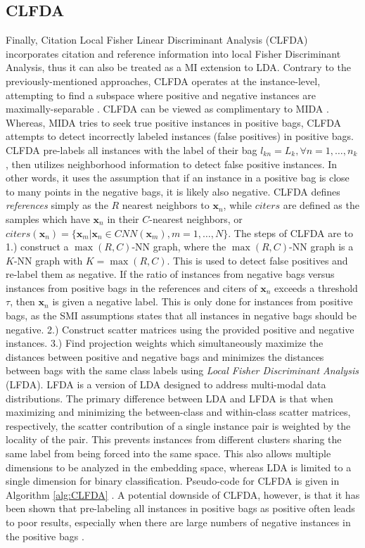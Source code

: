 \subsection{CLFDA} \label{sec:CLFDA}
Finally, Citation Local Fisher Linear Discriminant Analysis (CLFDA) \citep{Kim2010LocalDRMIL} incorporates citation and reference information into local Fisher Discriminant Analysis, thus it can also be treated as a MI extension to LDA.  Contrary to the previously-mentioned approaches, CLFDA operates at the instance-level, attempting to find a subspace where positive and negative instances are maximally-separable \citep{Latham2015MIFeatureRankingThesis}.  CLFDA can be viewed as complimentary to MIDA \citep{Chai2014MIDA}.  Whereas, MIDA tries to seek true positive instances in positive bags, CLFDA attempts to detect incorrectly labeled instances (false positives) in positive bags.  CLFDA pre-labels all instances with the label of their bag  $l_{kn} = L_{k}, \forall n = 1,\dots,n_{k}$, then utilizes neighborhood information to detect false positive instances.  In other words, it uses the assumption that if an instance in a positive bag is close to many points in the negative bags, it is likely also negative.  CLFDA defines \textit{references} simply as the $R$ nearest neighbors to $\bm{x}_{n}$, while $citers$ are defined as the samples which have $\bm{x}_{n}$ in their $C$-nearest neighbors, or $citers(\bm{x}_{n}) = \{ \bm{x}_{m}| \bm{x}_{n} \in CNN(\bm{x}_{m}), m=1, \dots, N \}$.   The steps of CLFDA are to 1.) construct a $\max(R,C)$-NN graph, where the $\max(R,C)$-NN graph is a $K$-NN graph with $K=\max(R,C)$.  This is used to detect false positives and re-label them as negative.  If the ratio of instances from negative bags versus instances from positive bags in the references and citers of $\bm{x}_n$ exceeds a threshold $\tau$, then $\bm{x}_{n}$ is given a negative label. This is only done for instances from positive bags, as the SMI assumptions states that all instances in negative bags should be negative. 2.) Construct scatter matrices using the provided positive and negative instances. 3.) Find projection weights which simultaneously maximize the distances between positive and negative bags and minimizes the distances between bags with the same class labels using \textit{Local Fisher Discriminant Analysis} (LFDA).  LFDA is a version of LDA  designed to address multi-modal data distributions.  The primary difference between LDA and LFDA is that when maximizing and minimizing the between-class and within-class scatter matrices, respectively, the scatter contribution of a single instance pair is weighted by the locality of the pair.  This prevents instances from different clusters sharing the same label from being forced into  the same space.  This also allows multiple dimensions to be analyzed in the embedding space, whereas LDA is limited to a single dimension for binary classification.  Pseudo-code for CLFDA is given in Algorithm \ref{alg:CLFDA} \citep{Latham2015MIFeatureRankingThesis}.  A potential downside of CLFDA, however, is that it has been shown that pre-labeling all instances in positive bags as positive often leads to poor results, especially when there are large numbers of negative instances in the positive bags \citep{Chai2014MIDA}.

